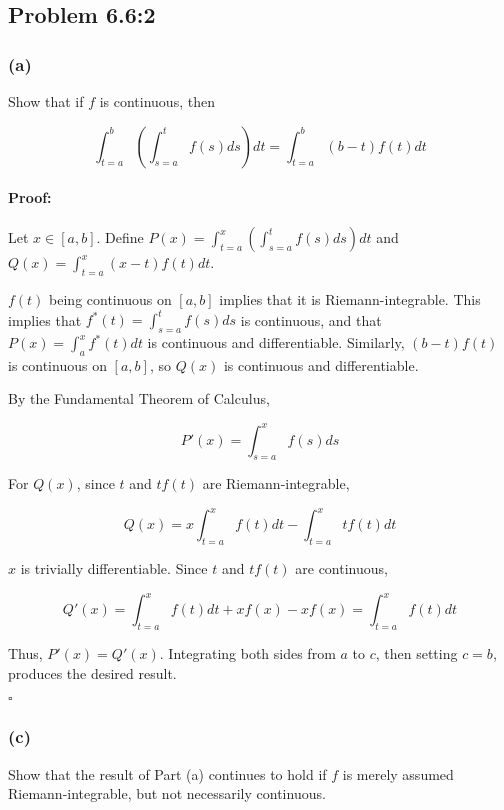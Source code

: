 \documentclass{article}
\newenvironment{proof}{\paragraph{Proof:}}{\hfill$\square$}
\begin{document}
\subsection*{Problem 6.6:2}

\subsubsection*{(a)}

Show that if $f$ is continuous, then

\[
\int_{t=a}^b \left(\int_{s=a}^t f(s) ds \right) dt
= \int_{t=a}^b (b-t) f(t) dt
\]

\begin{proof}

Let $x \in [a, b]$. Define $P(x) = \int_{t=a}^x \left(\int_{s=a}^t f(s) ds \right) dt$ and $Q(x) = \int_{t=a}^x (x-t) f(t) dt$.

$f(t)$ being continuous on $[a, b]$ implies that it is Riemann-integrable. This implies that $f^*(t) = \int_{s=a}^t f(s) ds$ is continuous, and that $P(x) = \int_a^x f^*(t)dt$ is continuous and differentiable. Similarly, $(b-t)f(t)$ is continuous on $[a, b]$, so $Q(x)$ is continuous and differentiable.

By the Fundamental Theorem of Calculus,

\[
P'(x) = \int_{s=a}^x f(s) ds
\]

For $Q(x)$, since $t$ and $tf(t)$ are Riemann-integrable,

\[
Q(x) = x \int_{t=a}^x f(t) dt - \int_{t=a}^x t f(t) dt
\]

$x$ is trivially differentiable. Since $t$ and $tf(t)$ are continuous,

\[
Q'(x) = \int_{t=a}^x f(t) dt + x f(x) - x f(x) = \int_{t=a}^x f(t) dt
\]

Thus, $P'(x) = Q'(x)$. Integrating both sides from $a$ to $c$, then setting $c = b$, produces the desired result.

\end{proof}

\subsubsection*{(c)}

Show that the result of Part (a) continues to hold if $f$ is merely assumed Riemann-integrable, but not necessarily continuous.
\end{document}

